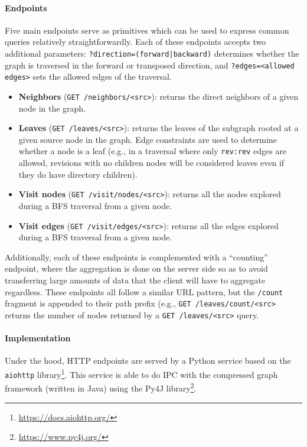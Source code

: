 \paragraph*{Endpoints}

Five main endpoints serve as primitives which can be used to express common
queries relatively straightforwardly. Each of these endpoints accepts two
additional parameters: \texttt{?direction=(forward|backward)} determines whether
the graph is traversed in the forward or transposed direction, and
\texttt{?edges=<allowed edges>} sets the allowed edges of the traversal.

\begin{itemize}
    \item \textbf{Neighbors} (\texttt{GET /neighbors/<src>}): returns the
        direct neighbors of a given node in the graph.
    \item \textbf{Leaves} (\texttt{GET /leaves/<src>}): returns the
        leaves of the subgraph rooted at a given source node in the graph. Edge
        constraints are used to determine whether a node is a leaf (e.g., in a
        traversal where only \texttt{rev:rev} edges are allowed, revisions with
        no children nodes will be considered leaves even if they do have
        directory children).
    \item \textbf{Visit nodes} (\texttt{GET /visit/nodes/<src>}): returns all
        the nodes explored during a \gls{BFS} traversal from a given node.
    \item \textbf{Visit edges} (\texttt{GET /visit/edges/<src>}): returns all
        the edges explored during a \gls{BFS} traversal from a given node.
\end{itemize}

Additionally, each of these endpoints is complemented with a ``counting''
endpoint, where the aggregation is done on the server side so as to avoid
transferring large amounts of data that the client will have to aggregate
regardless. These endpoints all follow a similar URL pattern, but the
\texttt{/count} fragment is appended to their path prefix (e.g., \texttt{GET
/leaves/count/<src>} returns the number of nodes returned by a \texttt{GET
/leaves/<src>} query.

\paragraph*{Implementation}

Under the hood, HTTP endpoints are served by a Python service based
on the \texttt{aiohttp} library\footnote{\url{https://docs.aiohttp.org/}}. This
service is able to do \gls{IPC} with the compressed graph framework (written in
Java) using the Py4J library\footnote{\url{https://www.py4j.org/}}.

